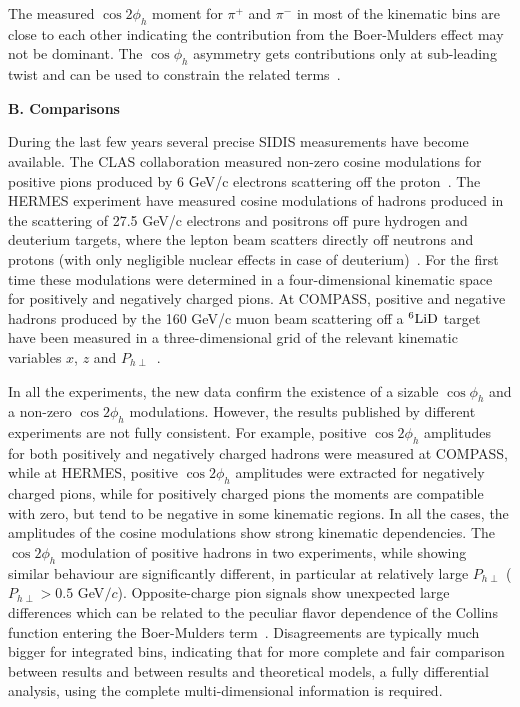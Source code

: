\documentclass[aps,prl,twocolumn,showpacs,superscriptaddress,groupedaddress]{revtex4-1}  %
\newcommand{\Phperp}{P_{h\perp}}
\begin{document}
The measured $\cos 2 \phi_h$ moment for $\pi^+$ and $\pi^-$ in most of the kinematic bins are close to each other indicating the contribution from the Boer-Mulders effect may not be dominant.
The $\cos \phi_h$ asymmetry gets contributions only at sub-leading twist and can be used to constrain the related terms~\cite{Cahn:1978se,Anselmino:2005nn,Berger:1979xz}.

\begin{center}
\textbf{B. Comparisons} \par
\end{center}

During the last few years several precise SIDIS measurements have become available. The CLAS
collaboration measured non-zero cosine modulations for positive pions produced
by 6 GeV/c electrons scattering off the proton~\cite{Osipenko:2008rv}.  The
HERMES experiment have measured cosine modulations of hadrons produced in the
scattering of 27.5 GeV/c electrons and positrons off pure hydrogen and deuterium
targets, where the lepton beam scatters directly off neutrons and protons (with
only negligible nuclear effects in case of
deuterium)~\cite{Airapetian:2012yg}. For the first time these modulations were
determined in a four-dimensional kinematic space for positively and negatively
charged pions.
At COMPASS, positive and negative hadrons produced by the 160 GeV/c muon beam
scattering off a $\rm ^6LiD$ target have been measured in a three-dimensional
grid of the relevant kinematic variables $x$, $z$ and
$\Phperp$~\cite{Adolph:2014pwc}.

In all the experiments, the new data confirm the existence of a sizable
$\cos\phi_h$ and a non-zero $\cos2\phi_h$ modulations.  However, the results
published by different experiments are not fully consistent. For example,
positive $\cos2\phi_h$ amplitudes for both positively and negatively charged
hadrons were measured at COMPASS, while at HERMES, positive $\cos 2\phi_h$ amplitudes
were extracted for negatively charged pions, while for positively charged pions
the moments are compatible with zero, but tend to be negative in some kinematic
regions. In all the cases, the amplitudes of the cosine modulations show strong
kinematic dependencies. 
The $\cos2\phi_h$ modulation of positive hadrons in two experiments, while showing similar behaviour are significantly different, in particular at relatively large $\Phperp$  ($\Phperp>0.5$ GeV$/c$).
Opposite-charge pion signals show unexpected large differences which can be related to the peculiar flavor dependence of the Collins function entering the Boer-Mulders term~\cite{Airapetian:2012yg}. Disagreements are typically much bigger for integrated bins, indicating that for 
more complete and fair comparison between results and between results
and theoretical models, a fully differential analysis, using the complete
multi-dimensional information is required.
\end{document}
